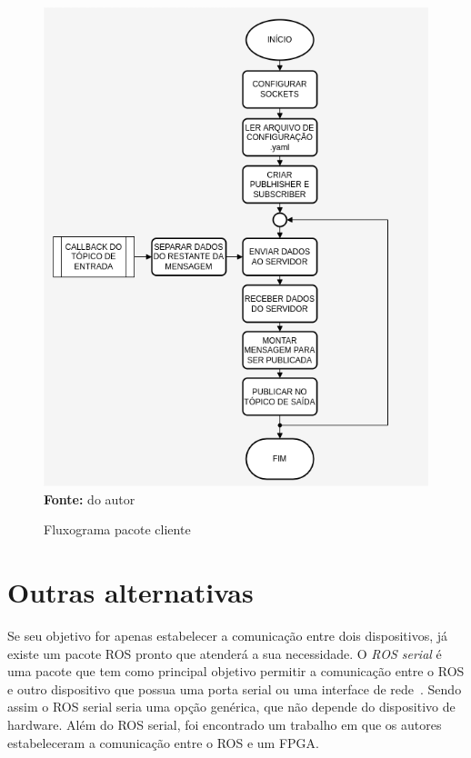 \begin{figure}[ht]
	\caption{Fluxograma pacote cliente}
	\begin{center}
		\includegraphics[scale=0.47]{imagens/fluxogramaCliente.png}\\
		{\small \textbf{Fonte:} do autor}
    \end{center}\label{fig:clientfluxo}
\end{figure}


\section{Outras alternativas}

Se seu objetivo for apenas estabelecer a comunicação entre dois dispositivos, já existe um pacote ROS pronto que atenderá a sua necessidade. O \textit{ROS serial} é uma pacote que tem como principal objetivo permitir a comunicação entre o ROS e outro dispositivo que possua uma porta serial ou uma interface de rede~\cite{RosSeria}. Sendo assim o ROS serial seria uma opção genérica, que não depende do dispositivo de hardware. Além do ROS serial, foi encontrado um trabalho em que os autores estabeleceram a comunicação entre o ROS e um FPGA\@. 

